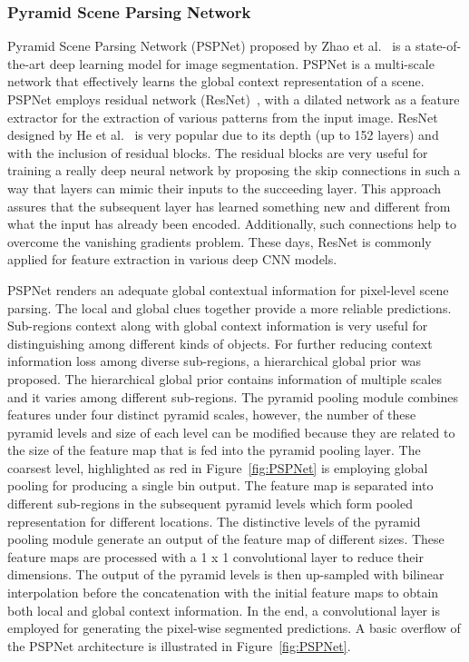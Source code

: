 \subsubsection{Pyramid Scene Parsing Network}
	Pyramid Scene Parsing Network (PSPNet) proposed by Zhao et al.~\cite{zhao2017pyramid} is a state-of-the-art deep learning model for image segmentation. PSPNet is a multi-scale network that effectively learns the global context representation of a scene. PSPNet employs residual network (ResNet)~\cite{he2016deep}, with a dilated network as a feature extractor for the extraction of various patterns from the input image. ResNet designed by He et al.~\cite{he2016deep} is very popular due to its depth (up to 152 layers) and with the inclusion of residual blocks. The residual blocks are very useful for training a really deep neural network by proposing the skip connections in such a way that layers can mimic their inputs to the succeeding layer. 
	This approach assures that the subsequent layer has learned something new and different from what the input has already been encoded. Additionally, such connections help to overcome the vanishing gradients problem. These days, ResNet is commonly applied for feature extraction in various deep CNN models. 
	
	PSPNet renders an adequate global contextual information for pixel-level scene parsing. The local and global clues together provide a more reliable predictions. Sub-regions context along with global context information is very useful for distinguishing among different kinds of objects. For further reducing context information loss among diverse sub-regions, a hierarchical global prior was proposed. The hierarchical global prior contains information of multiple scales and it varies among different sub-regions. The pyramid pooling module combines features under four distinct pyramid scales, however, the number of these pyramid levels and size of each level can be modified because they are related to the size of the feature map that is fed into the pyramid pooling layer. The coarsest level, highlighted as red in Figure~\ref{fig:PSPNet} is employing global pooling for producing a single bin output. The feature map is separated into different sub-regions in the subsequent pyramid levels which form pooled representation for different locations. The distinctive levels of the pyramid pooling module generate an output of the feature map of different sizes. These feature maps are processed with a 1 x 1 convolutional layer to reduce their dimensions. The output of the pyramid levels is then up-sampled with bilinear interpolation before the concatenation with the initial feature maps to obtain both local and global context information. In the end, a convolutional layer is employed for generating the pixel-wise segmented predictions. A basic overflow of the PSPNet architecture is illustrated in Figure~\ref{fig:PSPNet}. 
	
